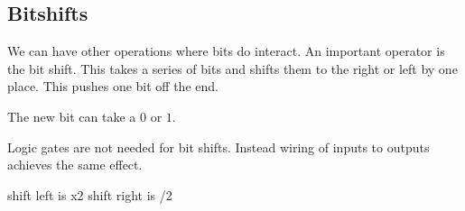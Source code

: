 
\subsection{Bitshifts}

We can have other operations where bits do interact. An important operator is the bit shift. This takes a series of bits and shifts them to the right or left by one place. This pushes one bit off the end. 

The new bit can take a \(0\) or \(1\).

Logic gates are not needed for bit shifts. Instead wiring of inputs to outputs achieves the same effect.


shift left is x2
shift right is /2




